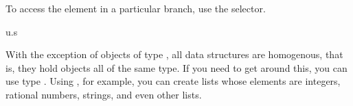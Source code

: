 \begin{xtc}
\begin{xtccomment}
To access the element in a particular branch, use the selector.
\end{xtccomment}
\begin{spadsrc}
u.s 
\end{spadsrc}
\begin{TeXOutput}
\begin{fricasmath}{5}
%
\end{fricasmath}
\end{TeXOutput}
\end{xtc}


With the exception of objects of type , all \Language{}
data structures are homogenous, that is, they hold objects all of the same
type.
If you need to get around this, you can use type .
Using , for example, you can create lists whose
elements are integers, rational numbers, strings, and even other lists.

